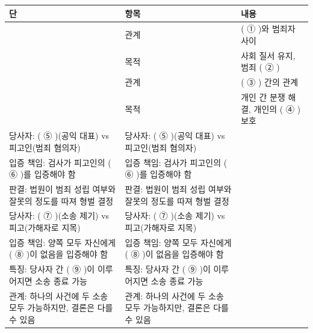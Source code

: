 \documentclass[fs9,seriesRus]{korfarm-base}
\begin{document}
\kfActivityBg \par{}\par\nopagebreak[4]\smallskip\nopagebreak[4]
\par\medskip{}
\begin{tcolorbox}[enhanced, breakable=true,
  colback=kfPaper, colframe=kfRule, boxrule=0.4pt, arc=2pt,
  left=8pt, right=8pt, top=6pt, bottom=6pt,
  title={\footnotesize\bfseries\color{kfMute} 글의 구조도},
  coltitle=kfMute, colbacktitle=kfPrimaryLight!40,
  attach boxed title to top left={yshift=-1.5mm, xshift=6pt},
  boxed title style={colframe=kfRule, boxrule=0.3pt, arc=1pt}]
\footnotesize{}
\renewcommand{\arraystretch}{1.35}
\noindent\begin{tabularx}{\linewidth}{|>{\centering\arraybackslash}p{1.6cm}|>{\raggedright\arraybackslash}p{3.4cm}|>{\raggedright\arraybackslash}X|}
\hline
\rowcolor{kfPrimaryLight!40}\textbf{\color{kfPrimary}단} & \textbf{\color{kfPrimary}항목} & \textbf{\color{kfPrimary}내용} \\\hline
\multirow{2}{*}{형사법} & 관계 & ( ① )와 범죄자 사이 \\\cline{2-3}
 & 목적 & 사회 질서 유지, 범죄 ( ② ) \\\cline{2-3}
\hline
\multirow{2}{*}{민사법} & 관계 & ( ③ ) 간의 관계 \\\cline{2-3}
 & 목적 & 개인 간 분쟁 해결, 개인의 ( ④ ) 보호 \\\cline{2-3}
\hline
당사자: ( ⑤ )(공익 대표) vs 피고인(범죄 혐의자) & 당사자: ( ⑤ )(공익 대표) vs 피고인(범죄 혐의자) &  \\\hline
입증 책임: 검사가 피고인의 ( ⑥ )를 입증해야 함 & 입증 책임: 검사가 피고인의 ( ⑥ )를 입증해야 함 &  \\\hline
판결: 법원이 범죄 성립 여부와 잘못의 정도를 따져 형벌 결정 & 판결: 법원이 범죄 성립 여부와 잘못의 정도를 따져 형벌 결정 &  \\\hline
당사자: ( ⑦ )(소송 제기) vs 피고(가해자로 지목) & 당사자: ( ⑦ )(소송 제기) vs 피고(가해자로 지목) &  \\\hline
입증 책임: 양쪽 모두 자신에게 ( ⑧ )이 없음을 입증해야 함 & 입증 책임: 양쪽 모두 자신에게 ( ⑧ )이 없음을 입증해야 함 &  \\\hline
특징: 당사자 간 ( ⑨ )이 이루어지면 소송 종료 가능 & 특징: 당사자 간 ( ⑨ )이 이루어지면 소송 종료 가능 &  \\\hline
관계: 하나의 사건에 두 소송 모두 가능하지만, 결론은 다를 수 있음 & 관계: 하나의 사건에 두 소송 모두 가능하지만, 결론은 다를 수 있음 &  \\\hline

\end{tabularx}
\end{tcolorbox}
\end{document}
